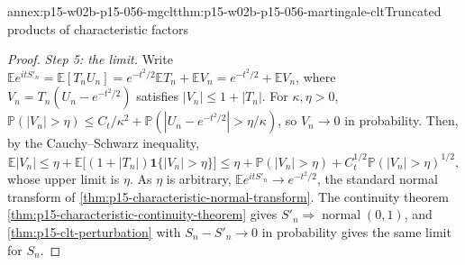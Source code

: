 \begin{annexitem}{annex:p15-w02b-p15-056-mgclt}{thm:p15-w02b-p15-056-martingale-clt}{Truncated products of characteristic factors}
\begin{proof}
\emph{Step 5: the limit.} Write
\(\mathbb Ee^{itS'_n}=\mathbb E[T_nU_n]=e^{-t^2/2}\mathbb ET_n+\mathbb EV_n
=e^{-t^2/2}+\mathbb EV_n\), where \(V_n=T_n(U_n-e^{-t^2/2})\) satisfies
\(|V_n|\leq1+|T_n|\). For \(\kappa,\eta>0\),
\(\mathbb P(|V_n|>\eta)\leq C_t/\kappa^2+\mathbb P(|U_n-e^{-t^2/2}|>\eta/\kappa)\),
so \(V_n\to0\) in probability. Then, by the Cauchy--Schwarz inequality,
\[
 \mathbb E|V_n|\leq\eta+\mathbb E\bigl[(1+|T_n|)\mathbf 1\{|V_n|>\eta\}\bigr]
 \leq\eta+\mathbb P(|V_n|>\eta)+C_t^{1/2}\mathbb P(|V_n|>\eta)^{1/2},
\]
whose upper limit is \(\eta\). As \(\eta\) is arbitrary,
\(\mathbb Ee^{itS'_n}\to e^{-t^2/2}\), the standard normal transform of
\cref{thm:p15-characteristic-normal-transform}. The continuity theorem
\cref{thm:p15-characteristic-continuity-theorem} gives
\(S'_n\Rightarrow\operatorname{normal}(0,1)\), and
\cref{thm:p15-clt-perturbation} with \(S_n-S'_n\to0\) in probability gives
the same limit for \(S_n\).
\end{proof}
\end{annexitem}

